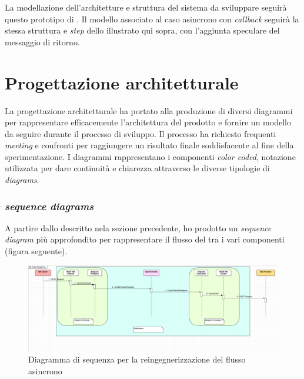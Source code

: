 La modellazione dell'architetture e struttura del sistema da sviluppare seguirà questo prototipo di .
Il modello associato al caso asincrono con \textit{callback} seguirà la stessa struttura e \textit{step} dello  illustrato qui sopra, con l'aggiunta speculare del messaggio di ritorno.

\section{Progettazione architetturale}

La progettazione architetturale ha portato alla produzione di diversi diagrammi  per rappresentare efficacemente l'architettura del prodotto e fornire un modello da seguire durante il processo di sviluppo.
Il processo ha richiesto frequenti \textit{meeting} e confronti per raggiungere un risultato finale soddisfacente al fine della sperimentazione.
I diagrammi rappresentano i componenti \textit{color coded}, notazione utilizzata per dare continuità e chiarezza attraverso le diverse tipologie di  \textit{diagrams}.

\subsubsection{ \textit{sequence diagrams}}


A partire dallo  descritto nela sezione precedente, ho prodotto un  \textit{sequence diagram} più approfondito per rappresentare il flusso del  tra i vari componenti (figura seguente).
\bigskip
\begin{figure}[h]
  \begin{center}
    \includegraphics[width=\textwidth, trim={0.2cm 0 0 0.2cm},clip]{images/a_sequence2.png}
    \caption{Diagramma  di sequenza per la reingegnerizzazione del flusso asincrono}
  \end{center}
\end{figure}

